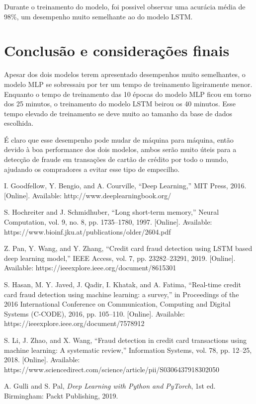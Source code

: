 \documentclass[conference]{IEEEtran}
\begin{document}
Durante o treinamento do modelo, foi possivel observar uma acurácia média de 98\%, um desempenho muito semelhante ao do modelo LSTM.

\section{Conclusão e considerações finais}

Apesar dos dois modelos terem apresentado desempenhos muito semelhantes, o modelo MLP se sobressaiu por ter um tempo de treinamento ligeiramente menor. Enquanto o tempo de treinamento das 10 épocas do modelo MLP ficou em torno dos 25 minutos, o treinamento do modelo LSTM beirou os 40 minutos. Esse tempo elevado de treinamento se deve muito ao tamanho da base de dados escolhida.

É claro que esse desempenho pode mudar de máquina para máquina, então devido à boa performance dos dois modelos, ambos serão muito úteis para a detecção de fraude em transações de cartão de crédito por todo o mundo, ajudando os compradores a evitar esse tipo de empecilho.

\begin{thebibliography}{00}
 I. Goodfellow, Y. Bengio, and A. Courville, ``Deep Learning,'' MIT Press, 2016. [Online]. Available: http://www.deeplearningbook.org/

 S. Hochreiter and J. Schmidhuber, ``Long short-term memory,'' Neural Computation, vol. 9, no. 8, pp. 1735--1780, 1997. [Online]. Available: https://www.bioinf.jku.at/publications/older/2604.pdf

 Z. Pan, Y. Wang, and Y. Zhang, ``Credit card fraud detection using LSTM based deep learning model,'' IEEE Access, vol. 7, pp. 23282--23291, 2019. [Online]. Available: https://ieeexplore.ieee.org/document/8615301

 S. Hasan, M. Y. Javed, J. Qadir, I. Khatak, and A. Fatima, ``Real-time credit card fraud detection using machine learning: a survey,'' in Proceedings of the 2016 International Conference on Communication, Computing and Digital Systems (C-CODE), 2016, pp. 105--110. [Online]. Available: https://ieeexplore.ieee.org/document/7578912

 S. Li, J. Zhao, and X. Wang, ``Fraud detection in credit card transactions using machine learning: A systematic review,'' Information Systems, vol. 78, pp. 12--25, 2018. [Online]. Available: https://www.sciencedirect.com/science/article/pii/S0306437918302050

 A. Gulli and S. Pal, \textit{Deep Learning with Python and PyTorch}, 1st ed. Birmingham: Packt Publishing, 2019.
\end{thebibliography}
\end{document}

